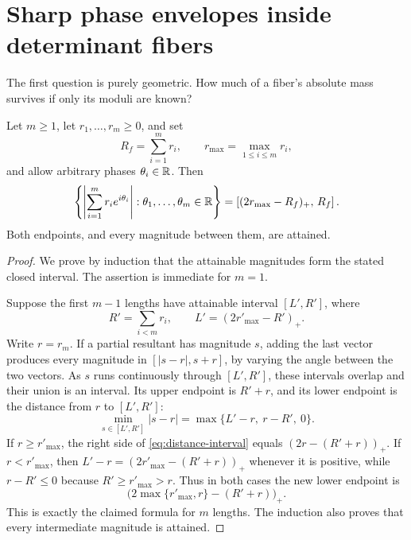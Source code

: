 \section{Sharp phase envelopes inside determinant fibers}
\label{sec:phase-envelope}

The first question is purely geometric.  How much of a fiber's
absolute mass survives if only its moduli are known?

\begin{theorem}
\label{thm:resultant-interval}
Let \(m\ge1\), let \(r_1,\ldots,r_m\ge0\), and set
\[
 R_f=\sum_{i=1}^m r_i,\qquad
 r_{\max}=\max_{1\le i\le m}r_i,
\]
and allow arbitrary phases \(\theta_i\in\mathbb R\).  Then
\begin{equation}
 \left\{
 \left|\sum_{i=1}^m r_i e^{i\theta_i}\right|:
 \theta_1,\ldots,\theta_m\in\mathbb R
 \right\}
 =
 \left[(2r_{\max}-R_f)_+,\,R_f\right].
\label{eq:complete-resultant-interval}
\end{equation}
Both endpoints, and every magnitude between them, are attained.
\end{theorem}

\begin{proof}
We prove by induction that the attainable magnitudes form the stated
closed interval.  The assertion is immediate for \(m=1\).

Suppose the first \(m-1\) lengths have attainable interval
\([L',R']\), where
\[
 R'=\sum_{i<m}r_i,\qquad
 L'=(2r'_{\max}-R')_+.
\]
Write \(r=r_m\).  If a partial resultant has magnitude \(s\), adding
the last vector produces every magnitude in
\([|s-r|,s+r]\), by varying the angle between the two vectors.  As
\(s\) runs continuously through \([L',R']\), these intervals overlap
and their union is an interval.  Its upper endpoint is \(R'+r\), and
its lower endpoint is the distance from \(r\) to \([L',R']\):
\begin{equation}
 \min_{s\in[L',R']}|s-r|
 =\max\{L'-r,\ r-R',\ 0\}.
\label{eq:distance-interval}
\end{equation}
If \(r\ge r'_{\max}\), the right side of
\eqref{eq:distance-interval} equals
\((2r-(R'+r))_+\).  If \(r<r'_{\max}\), then
\(L'-r=(2r'_{\max}-(R'+r))_+\) whenever it is positive, while
\(r-R'\le0\) because \(R'\ge r'_{\max}>r\).  Thus in both cases the
new lower endpoint is
\[
 \bigl(2\max\{r'_{\max},r\}-(R'+r)\bigr)_+.
\]
This is exactly the claimed formula for \(m\) lengths.  The induction
also proves that every intermediate magnitude is attained.
\end{proof}

